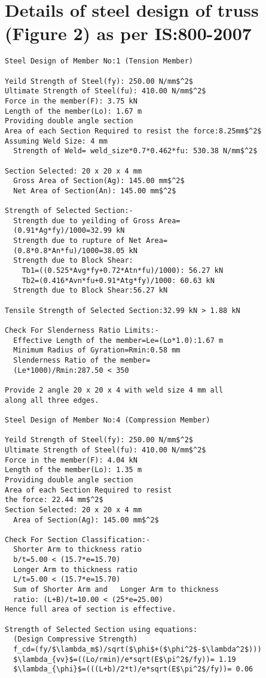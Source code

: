 \documentclass[preprint]{elsarticle}
\begin{document}
\section{Details of steel design of truss (Figure 2) as per IS:800-2007} \label{App:DetailedResult}
\begin{verbatim}
Steel Design of Member No:1 (Tension Member)

Yeild Strength of Steel(fy): 250.00 N/mm$^2$ 
Ultimate Strength of Steel(fu): 410.00 N/mm$^2$ 
Force in the member(F): 3.75 kN 
Length of the member(Lo): 1.67 m 
Providing double angle section
Area of each Section Required to resist the force:8.25mm$^2$  
Assuming Weld Size: 4 mm 
  Strength of Weld= weld_size*0.7*0.462*fu: 530.38 N/mm$^2$  

Section Selected: 20 x 20 x 4 mm 
  Gross Area of Section(Ag): 145.00 mm$^2$  
  Net Area of Section(An): 145.00 mm$^2$  

Strength of Selected Section:-
  Strength due to yeilding of Gross Area=
  (0.91*Ag*fy)/1000=32.99 kN 
  Strength due to rupture of Net Area=
  (0.8*0.8*An*fu)/1000=38.05 kN 
  Strength due to Block Shear:
    Tb1=((0.525*Avg*fy+0.72*Atn*fu)/1000): 56.27 kN 
    Tb2=(0.416*Avn*fu+0.91*Atg*fy)/1000: 60.63 kN 
  Strength due to Block Shear:56.27 kN 

Tensile Strength of Selected Section:32.99 kN > 1.88 kN 

Check For Slenderness Ratio Limits:- 
  Effective Length of the member=Le=(Lo*1.0):1.67 m 
  Minimum Radius of Gyration=Rmin:0.58 mm
  Slenderness Ratio of the member=
  (Le*1000)/Rmin:287.50 < 350 

Provide 2 angle 20 x 20 x 4 with weld size 4 mm all 
along all three edges.
 
Steel Design of Member No:4 (Compression Member)

Yeild Strength of Steel(fy): 250.00 N/mm$^2$ 
Ultimate Strength of Steel(fu): 410.00 N/mm$^2$ 
Force in the member(F): 4.04 kN 
Length of the member(Lo): 1.35 m 
Providing double angle section
Area of each Section Required to resist 
the force: 22.44 mm$^2$  
Section Selected: 20 x 20 x 4 mm 
  Area of Section(Ag): 145.00 mm$^2$  

Check For Section Classification:- 
  Shorter Arm to thickness ratio 
  b/t=5.00 < (15.7*e=15.70)
  Longer Arm to thickness ratio  
  L/t=5.00 < (15.7*e=15.70)
  Sum of Shorter Arm and   Longer Arm to thickness 
  ratio: (L+B)/t=10.00 < (25*e=25.00)
Hence full area of section is effective.

Strength of Selected Section using equations:
  (Design Compressive Strength)
  f_cd=(fy/$\lambda_m$)/sqrt($\phi$+($\phi^2$-$\lambda^2$)))
  $\lambda_{vv}$=((Lo/rmin)/e*sqrt(E$\pi^2$/fy))= 1.19
  $\lambda_{\phi}$=(((L+b)/2*t)/e*sqrt(E$\pi^2$/fy))= 0.06


\end{verbatim}
\end{document}
